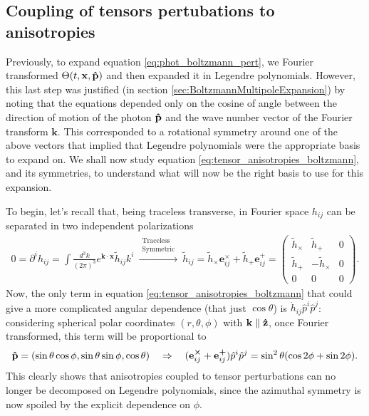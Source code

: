 \subsection{Coupling of tensors pertubations to anisotropies}\label{sec:TensorCoupling}
Previously, to expand equation \eqref{eq:phot_boltzmann_pert}, we Fourier transformed $\Theta(t,\mathbf{x},\mathbf{\hat{p}})$ and then expanded it in Legendre polynomials. However, this last step was justified (in section \ref{sec:BoltzmannMultipoleExpansion}) by noting that the equations depended only on the cosine of angle between the direction of motion of the photon $\mathbf{\hat{p}}$ and the wave number vector of the Fourier transform $\mathbf{k}$. This corresponded to a rotational symmetry around one of the above vectors that implied that Legendre polynomials were the appropriate basis to expand on. We shall now study equation \eqref{eq:tensor_anisotropies_boltzmann}, and its symmetries, to understand  what will now be the right basis to use for this expansion.

To begin, let's recall that, being traceless transverse, in Fourier space $h_{ij}$ can be separated in two independent polarizations
\begin{align*}
    0=\partial^ih_{ij}=\int\frac{d^3k}{(2\pi)^3}e^{\mathbf{k}\cdot\mathbf{x}}\tilde h_{ij}k^i \ \xrightarrow{\substack{\text{Traceless}\\\text{Symmetric}}}\ \tilde h_{ij}=\tilde h_{\boldsymbol \times} \mathbf{e}_{ij}^{\boldsymbol \times}+\tilde h_{\boldsymbol +} \mathbf{e}_{ij}^{\boldsymbol +}=
    \begin{pmatrix}
        \tilde h_{\boldsymbol \times} & \tilde h_{\boldsymbol +} & 0\\
        \tilde h_{\boldsymbol +} & -\tilde h_{\boldsymbol \times} & 0\\
        0&0&0
    \end{pmatrix}.
\end{align*}
Now, the only term in equation \eqref{eq:tensor_anisotropies_boltzmann} that could give a more complicated angular dependence (that just $\cos\theta$) is $\dot{h}_{ij}\hat p^i\hat p^j$: considering spherical polar coordinates $(r,\theta,\phi)$ with $\mathbf k\parallel \mathbf{\hat{z}}$, once Fourier transformed, this term will be proportional to
\begin{align*}
    \mathbf{\hat{p}}=(\sin\theta\cos\phi,\sin\theta\sin\phi,\cos\theta)\quad \Rightarrow\quad (\mathbf{e}_{ij}^{\boldsymbol \times}+\mathbf{e}_{ij}^{\boldsymbol +})\hat p^i\hat p^j=\sin^2\theta(\cos2\phi+\sin2\phi).
\end{align*} 
This clearly shows that anisotropies coupled to tensor perturbations can no longer be decomposed on Legendre polynomials, since the azimuthal symmetry is now spoiled by the explicit dependence on $\phi$.

